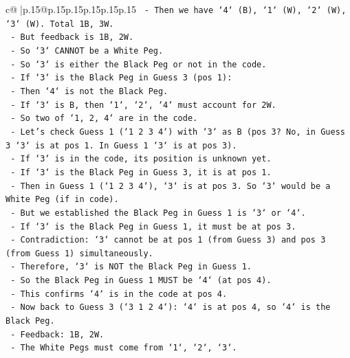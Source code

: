 \documentclass{article}
\begin{document}
{\begin{supertabular}{c@{$\;$}|p{.15\linewidth}@{}p{.15\linewidth}p{.15\linewidth}p{.15\linewidth}p{.15\linewidth}p{.15\linewidth}}
{{{\texttt{            {-} Then we have `4` (B), `1` (W), `2` (W), `3` (W). Total 1B, 3W.} \\
\texttt{            {-} But feedback is 1B, 2W.} \\
\texttt{            {-} So `3` CANNOT be a White Peg.} \\
\texttt{            {-} So `3` is either the Black Peg or not in the code.} \\
\texttt{            {-} If `3` is the Black Peg in Guess 3 (pos 1):} \\
\texttt{                {-} Then `4` is not the Black Peg.} \\
\texttt{                {-} If `3` is B, then `1`, `2`, `4` must account for 2W.} \\
\texttt{                {-} So two of `1, 2, 4` are in the code.} \\
\texttt{                {-} Let's check Guess 1 (`1 2 3 4`) with `3` as B (pos 3? No, in Guess 3 `3` is at pos 1. In Guess 1 `3` is at pos 3).} \\
\texttt{                {-} If `3` is in the code, its position is unknown yet.} \\
\texttt{                {-} If `3` is the Black Peg in Guess 3, it is at pos 1.} \\
\texttt{                {-} Then in Guess 1 (`1 2 3 4`), `3` is at pos 3. So `3` would be a White Peg (if in code).} \\
\texttt{                {-} But we established the Black Peg in Guess 1 is `3` or `4`.} \\
\texttt{                {-} If `3` is the Black Peg in Guess 1, it must be at pos 3.} \\
\texttt{                {-} Contradiction: `3` cannot be at pos 1 (from Guess 3) and pos 3 (from Guess 1) simultaneously.} \\
\texttt{                {-} Therefore, `3` is NOT the Black Peg in Guess 1.} \\
\texttt{                {-} So the Black Peg in Guess 1 MUST be `4` (at pos 4).} \\
\texttt{                {-} This confirms `4` is in the code at pos 4.} \\
\texttt{                {-} Now back to Guess 3 (`3 1 2 4`): `4` is at pos 4, so `4` is the Black Peg.} \\
\texttt{                {-} Feedback: 1B, 2W.} \\
\texttt{                {-} The White Pegs must come from `1`, `2`, `3`.} \\
}}}
\end{supertabular}}
\end{document}
